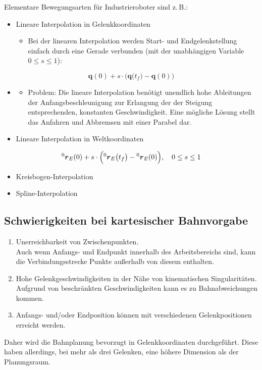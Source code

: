 \documentclass[a4paper, 11pt, accentcolor = tud3b]{tudreport}
\renewcommand{\vec}[1]{\boldsymbol{#1}}
\begin{document}
			Elementare Bewegungsarten für Industrieroboter sind z.\,B.:
			\begin{itemize}
				\item Lineare Interpolation in Gelenkkoordinaten
					\begin{itemize}
						\item Bei der linearen Interpolation werden Start- und Endgelenkstellung einfach durch eine Gerade verbunden (mit der unabhängigen Variable \( 0 \leq s \leq 1 \)):
					\end{itemize}
			\end{itemize}
			\begin{equation*}
				\vec{q}(0) + s \cdot \Big( \vec{q}\big(t_f\big) - \vec{q}(0) \Big)
			\end{equation*}
			\begin{itemize}
				\item[]
					\begin{itemize}
						\item Problem: Die lineare Interpolation benötigt unendlich hohe Ableitungen der Anfangsbeschleunigung zur Erlangung der der Steigung entsprechenden, konstanten Geschwindigkeit. Eine mögliche Lösung stellt das Anfahren und Abbremsen mit einer Parabel dar.
					\end{itemize}
				\item Lineare Interpolation in Weltkoordinaten
			\end{itemize}
			\begin{equation*}
				\prescript{0}{}{\vec{r}}_E(0) + s \cdot \Big(\! \prescript{0}{}{\vec{r}}_E \big(t_f\big) - \prescript{0}{}{\vec{r}}_E(0) \Big),\quad 0 \leq s \leq 1
			\end{equation*}
			\begin{itemize}
				\item Kreisbogen-Interpolation
				\item Spline-Interpolation
			\end{itemize}

			\subsection{Schwierigkeiten bei kartesischer Bahnvorgabe}
				\begin{enumerate}
					\item Unerreichbarkeit von Zwischenpunkten. \\ Auch wenn Anfangs- und Endpunkt innerhalb des Arbeitsbereichs sind, kann die Verbindungsstrecke Punkte außerhalb von diesem enthalten.
					\item Hohe Gelenkgeschwindigkeiten in der Nähe von kinematischen Singularitäten. \\ Aufgrund von beschränkten Geschwindigkeiten kann es zu Bahnabweichungen kommen.
					\item Anfangs- und/oder Endposition können mit verschiedenen Gelenkpositionen erreicht werden.
				\end{enumerate}
				Daher wird die Bahnplanung bevorzugt in Gelenkkoordinaten durchgeführt. Diese haben allerdings, bei mehr als drei Gelenken, eine höhere Dimension als der Planungsraum.
\end{document}
